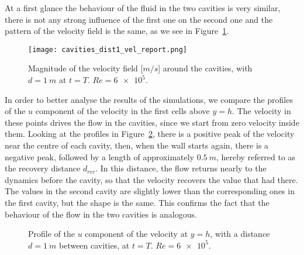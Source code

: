 At a first glance the behaviour of the fluid in the two cavities is very 
similar, there is not any strong influence of the first one on the second one 
and the pattern of the velocity field is the same, as we see in Figure~\ref{fig:veld1}. 
\begin{figure}
	\centering
	\texttt{[image: cavities\_dist1\_vel\_report.png]}
	\caption[Magnitude of the velocity field in the cavities problem]{Magnitude of the velocity field [$\si{m/s}$] around the cavities, with $d=\SI{1}{m}$ at $t=T$. $Re=\num{6e5}$.}
	\label{fig:veld1}
\end{figure}
In order to better analyse the results of the simulations, we compare the 
profiles of the $u$ component of the velocity in the first cells above $y=h$. The velocity in these points drives the flow in the cavities, 
since we start from zero velocity inside them.
Looking at the profiles in Figure~\ref{fig:velprofile1}, there is a positive 
peak of the velocity near the centre of each cavity, then, when the wall starts 
again, there is a negative peak, followed by a
length of approximately $\SI{0.5}{m}$, hereby referred to as the recovery distance $d_{rec}$.
In this distance, the flow returns nearly to the dynamics before the cavity, so that the velocity recovers the value that had there.
The values in the second 
cavity are slightly lower than the corresponding ones in the first cavity, but 
the shape is the same. This confirms the fact that the behaviour of the flow 
in the two cavities is analogous.
\begin{figure}
	\centering
	
	\caption[Profile of the $u$ component of the velocity at $y=h$ in the cavities problem]{Profile of the $u$ component of the velocity at $y=h$, with a distance $d=\SI{1}{m}$ between cavities, at $t=T$. $Re = \num{6e5}$.}
	\label{fig:velprofile1}
\end{figure}

